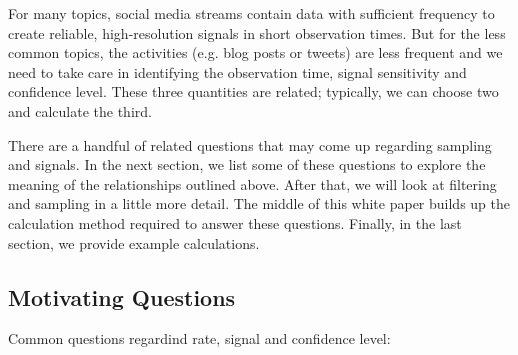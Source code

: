 \documentclass{article}
\begin{document}
%
%
%

For many topics, social media streams contain data with sufficient frequency to create reliable, high-resolution signals in short observation times.  But for the less common topics, the activities (e.g. blog posts or tweets) are less frequent and we need to take care in identifying the observation time, signal sensitivity and confidence level. These three quantities are related; typically, we can choose two and calculate the third.

There are a handful of related questions that may come up regarding sampling and signals.  In the next section, we list some of these questions to explore the meaning of the relationships outlined above. After that, we will look at filtering and sampling in a little more detail.  The middle of this white paper builds up the calculation method required to answer these questions. Finally, in the last section, we provide example calculations.

\subsection{Motivating Questions} 

Common questions regardind rate, signal and confidence level:
\end{document}
